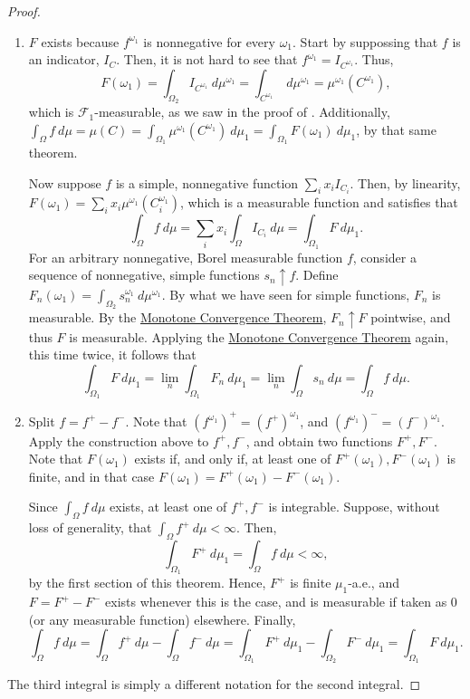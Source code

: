 \begin{proof}
    \begin{enumerate}
        \item \(F\) exists because \(f^{\omega_1}\) is nonnegative for every \(\omega_1\). Start by suppossing that \(f\) is an indicator, \(I_C\). Then, it is not hard to see that \(f^{\omega_1}=I_{C^{\omega_1}}\). Thus,
        \[
            F(\omega_1)=\int_{\Omega_2}I_{C^{\omega_1}}~d\mu^{\omega_1}=\int_{C^{\omega_1}}~d\mu^{\omega_1}=\mu^{\omega_1}(C^{\omega_1})
        ,\]
        which is \(\mathcal{F}_1\)-measurable, as we saw in the proof of . Additionally, \(\int_{\Omega}f~d\mu=\mu(C)=\int_{\Omega_1}\mu^{\omega_1}(C^{\omega_1})~d\mu_1=\int_{\Omega_1}F(\omega_1)~d\mu_1\), by that same theorem.

        Now suppose \(f\) is a simple, nonnegative function \(\sum_{i} x_iI_{C_i}\). Then, by linearity, \(F(\omega_1)=\sum_{i} x_i\mu^{\omega_1}(C_i^{\omega_1})\), which is a measurable function and satisfies that
        \[
            \int_{\Omega}f~d\mu=\sum_{i} x_i\int_{\Omega}I_{C_i}~d\mu=\int_{\Omega_1}F~d\mu_1
        .\]
				For an arbitrary nonnegative, Borel measurable function \(f\), consider a sequence of nonnegative, simple functions \(s_n\uparrow f\). Define \(F_n(\omega_1)=\int_{\Omega_2}s_n^{\omega_1}~d\mu^{\omega_1}\). By what we have seen for simple functions, \(F_n\) is measurable. By the \hyperref[theorem:Monotone Convergence]{Monotone Convergence Theorem}, \(F_n\uparrow F\) pointwise, and thus \(F\) is measurable.
        Applying the \hyperref[theorem:Monotone Convergence]{Monotone Convergence Theorem} again, this time twice, it follows that
        \[
            \int_{\Omega_1}F~d\mu_1=\lim_n\int_{\Omega_1}F_n~d\mu_1=\lim_n\int_{\Omega}s_n~d\mu=\int_{\Omega}f~d\mu
        .\]
    \item Split \(f=f^{+}-f^{-}\). Note that \((f^{\omega_1})^{+}=\left(f^{+}\right)^{\omega_1}\), and \((f^{\omega_1})^{-}=\left(f^{-}\right)^{\omega_1}\). Apply the construction above to \(f^{+},f^{-}\), and obtain two functions \(F^{+}, F^{-}\). Note that \(F(\omega_1)\) exists if, and only if, at least one of \(F^{+}(\omega_1),F^{-}(\omega_1)\) is finite, and in that case \(F(\omega_1)=F^{+}(\omega_1)-F^{-}(\omega_1)\).

    Since \(\int_{\Omega}f~d\mu\) exists, at least one of \(f^{+},f^{-}\) is integrable. Suppose, without loss of generality, that \(\int_{\Omega}f^{+}~d\mu<\infty\). Then,
    \[
        \int_{\Omega_1}F^{+}~d\mu_1=\int_{\Omega}f~d\mu<\infty
    ,\]
    by the first section of this theorem. Hence, \(F^{+}\) is finite \(\mu_1\)-a.e., and \(F=F^{+}-F^{-}\) exists whenever this is the case, and is measurable if taken as \(0\) (or any measurable function) elsewhere. Finally,
    \[
        \int_{\Omega}f~d\mu=\int_{\Omega}f^{+}~d\mu-\int_{\Omega}f^{-}~d\mu=\int_{\Omega_1}F^{+}~d\mu_1-\int_{\Omega_2}F^{-}~d\mu_1=\int_{\Omega_1}F~d\mu_1
    .\]
    \end{enumerate}
The third integral is simply a different notation for the second integral.
\end{proof}
